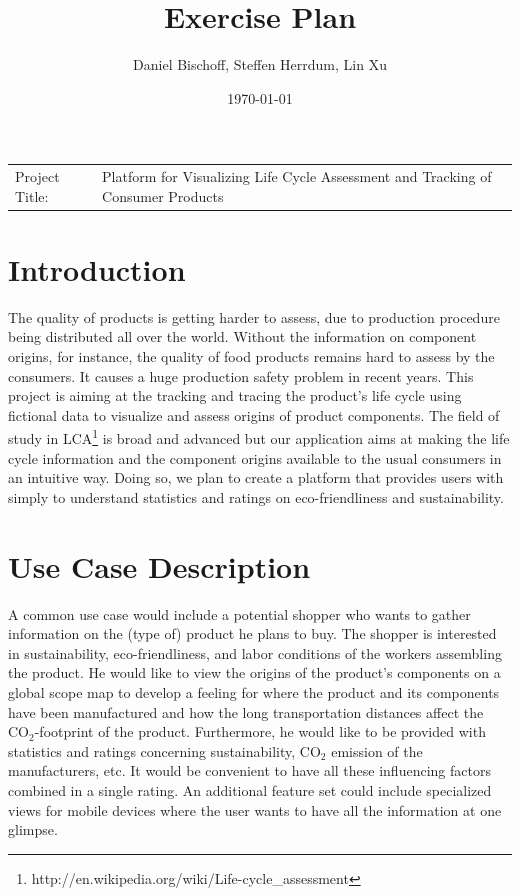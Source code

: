 \documentclass[a4page]{article}
\author{Daniel Bischoff, Steffen Herrdum, Lin Xu}
\title{Exercise Plan}
\date{\today}
\begin{document}
\maketitle

\begin{table}[!th]
\begin{tabular}{l p{}}

Project Title: & Platform for Visualizing Life Cycle Assessment and Tracking of Consumer Products \\

\end{tabular}
\end{table}

\section{Introduction}
The quality of products is getting harder to assess, due to production procedure being distributed all over the world.
Without the information on component origins, for instance, the quality of food products remains hard to assess by the consumers.
It causes a huge production safety problem in recent years.
This project is aiming at the tracking and tracing the product's life cycle using fictional data to visualize and assess origins of product components.
The field of study in \ac{LCA}\footnote{http://en.wikipedia.org/wiki/Life-cycle\_assessment} is broad and advanced but our application aims at making the life cycle information and the component origins available to the usual consumers in an intuitive way.
Doing so, we plan to create a platform that provides users with simply to understand statistics and ratings on eco-friendliness and sustainability.

\section{Use Case Description}
A common use case would include a potential shopper who wants to gather information on the (type of) product he plans to buy.
The shopper is interested in sustainability, eco-friendliness, and labor conditions of the workers assembling the product.
He would like to view the origins of the product's components on a global scope map to develop a feeling for where the product and its components have been manufactured and how the long transportation distances affect the $\mathrm{CO}_2$-footprint of the product.
Furthermore, he would like to be provided with statistics and ratings concerning sustainability, $\mathrm{CO}_2$ emission of the manufacturers, etc.
It would be convenient to have all these influencing factors combined in a single rating.
An additional feature set could include specialized views for mobile devices where the user wants to have all the information at one glimpse.
\end{document}
